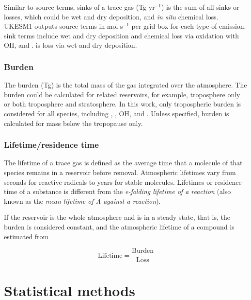 Similar to source terms, sinks of a trace gas (Tg yr$^{-1}$) is the sum of all sinks or losses, which could be wet and dry deposition, and \textit{in situ} chemical loss. UKESM1 outputs source terms in mol s$^{-1}$ per grid box for each type of emission.  sink terms include wet and dry deposition and chemical loss via oxidation with OH,  and .  is loss via wet and dry deposition.

\subsubsection{Burden}

The burden (Tg) is the total mass of the gas integrated over the atmosphere. The burden could be calculated for related reservoirs, for example, troposphere only or both troposphere and stratosphere. In this work, only tropospheric burden is considered for all species, including , , OH,  and . Unless specified, burden is calculated for mass below the tropopause only.

\subsubsection{Lifetime/residence time}

The lifetime of a trace gas is defined as the average time that a molecule of that species remains in a reservoir before removal. Atmospheric lifetimes vary from seconds for reactive radicals to years for stable molecules. Lifetimes or residence time of a substance is different from the \textit{e-folding lifetime of a reaction} (also known as the \textit{mean lifetime of A against a reaction}). 

If the reservoir is the whole atmosphere and is in a steady state, that is, the burden is considered constant, and the atmospheric lifetime of a compound is estimated from 

\begin{equation}
\label{eq:lifetime}
 \text{Lifetime} = \frac{\text{Burden}}{\text{Loss}}    
\end{equation}

\section{Statistical methods}

